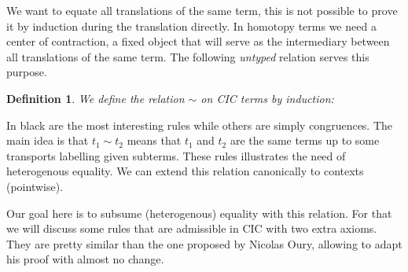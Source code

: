 \documentclass[11pt]{article}
\theoremstyle{plain}
\newtheorem{definition}{Definition}
\theoremstyle{remark}
\begin{document}
We want to equate all translations of the same term, this is not possible to
prove it by induction during the translation directly. In homotopy terms
we need a center of contraction, \ie a fixed object that will serve as the
intermediary between all translations of the same term.
The following \emph{untyped} relation serves this purpose.

\begin{definition}
  We define the relation $\sim$ on CIC terms by induction:
  \begin{mathc}
    {\color{gray}
    }
    \qquad
    \qquad
    \qquad
    {\color{gray}
    }
  \end{mathc}
  \begin{mathc}
    \color{gray}
    \qquad
  \end{mathc}
\end{definition}

In black are the most interesting rules while others are simply congruences.
The main idea is that $t_1 \sim t_2$ means that $t_1$ and $t_2$ are the same
terms up to some transports labelling given subterms.
These rules illustrates the need of heterogenous equality.
We can extend this relation canonically to contexts (pointwise).

Our goal here is to subsume (heterogenous) equality with this relation.
For that we will discuss some rules that are admissible in CIC with two extra
axioms. They are pretty similar than the one proposed by Nicolas Oury, allowing
to adapt his proof with almost no change.
\end{document}
